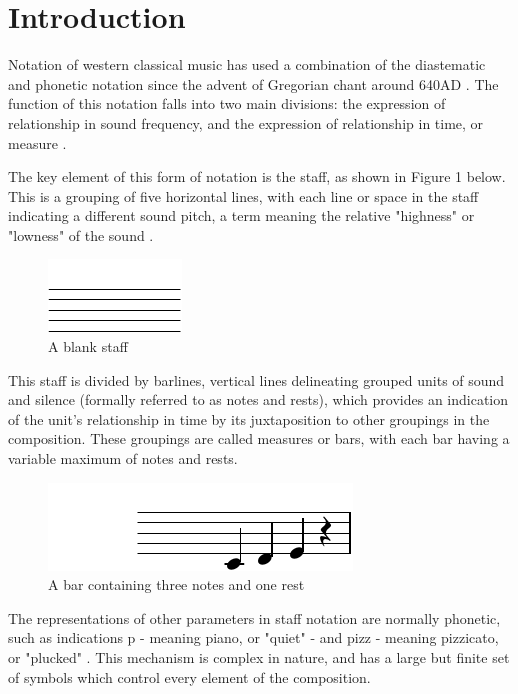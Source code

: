 \section{Introduction}
Notation of western classical music has used a combination of the diastematic and phonetic notation \parencite{RRastall} since the advent of Gregorian chant around 640AD \parencite{RTaruskin}. The function of this notation falls into two main divisions: the expression of relationship in sound frequency, and the expression of relationship in time, or measure \parencite{oxHistory}.

The key element of this form of notation is the staff, as shown in Figure 1 below. This is a grouping of five horizontal lines, with each line or space in the staff indicating a different sound pitch, a term meaning the relative "highness" or "lowness" of the sound \parencite{classroom}.

\begin{figure}[htbp]
    \centering
        \includegraphics{staff-crop.pdf}
    \caption{A blank staff}
\end{figure}

This staff is divided by barlines, vertical lines delineating grouped units of sound and silence (formally referred to as notes and rests), which provides an indication of the unit's relationship in time by its juxtaposition to other groupings in the composition. These groupings are called measures or bars, with each bar having a variable maximum of notes and rests. 

\begin{figure}[htbp]
    \centering
        \includegraphics{bar_with_notes-crop.pdf}
    \caption{A bar containing three notes and one rest}
\end{figure}

The representations of other parameters in staff notation are normally phonetic, such as indications p - meaning piano, or "quiet" - and pizz - meaning pizzicato, or "plucked" \parencite{RRastall}. This mechanism is complex in nature, and has a large but finite set of symbols which control every element of the composition.

